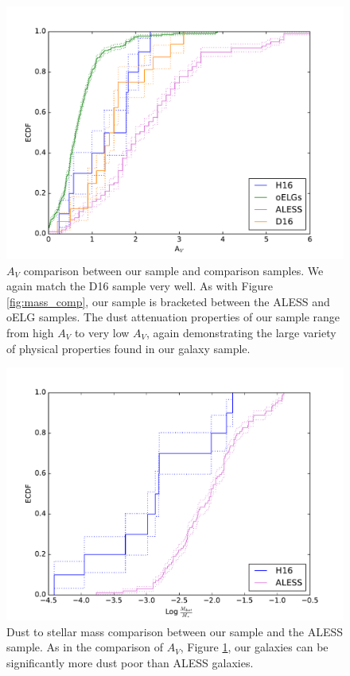 \documentclass[preprint,natbib209]{aastex}
\begin{document}
\begin{figure}[t]
\centering
\includegraphics[scale=0.8]{ecdf_av.pdf}
\caption{$A_V$ comparison between our sample and  comparison samples. We again match the D16 sample very well. As with Figure \ref{fig:mass_comp}, our sample is bracketed between the ALESS and oELG samples. The dust attenuation properties of our sample range from high $A_V$ to very low $A_V$, again demonstrating the large variety of physical properties found in our galaxy sample.}
\label{fig:av_comp}
\end{figure}

\begin{figure}[t]
\centering
\includegraphics[scale=0.8]{ecdf_mdust_mstar.pdf}
\caption{Dust to stellar mass comparison between our sample and the ALESS sample. As in the comparison of $A_V$, Figure \ref{fig:av_comp}, our galaxies can be significantly more dust poor than ALESS galaxies.}
\label{fig:mstar_mdust}
\end{figure}
\end{document}
